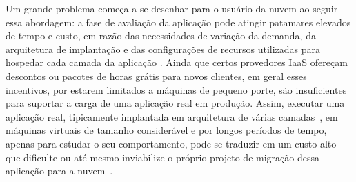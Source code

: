\documentclass[12pt]{article}
\begin{document}

Um grande problema começa a se desenhar para o usuário da nuvem ao seguir essa abordagem: a fase de avaliação da 
aplicação pode atingir patamares elevados de tempo e custo, em razão das necessidades de variação da demanda, da 
arquitetura de implantação e das configurações de recursos utilizadas para hospedar 
cada camada da aplicação \cite{silva2013cloudbench}. Ainda que certos provedores IaaS ofereçam descontos ou 
pacotes de horas grátis para novos clientes, em geral esses incentivos, por estarem limitados a máquinas de pequeno porte, são 
insuficientes para suportar a carga de uma aplicação real em produção. Assim, executar uma aplicação real, tipicamente 
implantada em arquitetura de várias camadas~\cite{jayasinghe2011variations}, em máquinas virtuais de tamanho 
considerável e por longos períodos de tempo, apenas para estudar o seu comportamento, pode se traduzir em um custo 
alto que dificulte ou até mesmo inviabilize o próprio projeto de migração dessa aplicação para a nuvem~\cite{beserra2012cloudstep}. 
\end{document}
